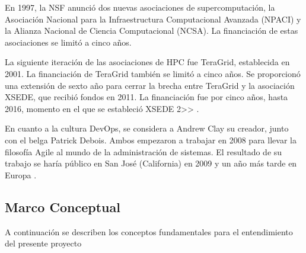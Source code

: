 \documentclass[letterpaper, 12pt, oneside]{article}
\begin{document}
    En 1997, la NSF anunció dos nuevas asociaciones de supercomputación, la Asociación Nacional para la Infraestructura Computacional Avanzada (NPACI) y la Alianza Nacional de Ciencia Computacional (NCSA). La financiación de estas asociaciones se limitó a cinco años.
    
    La siguiente iteración de las asociaciones de HPC fue TeraGrid, establecida en 2001. La financiación de TeraGrid también se limitó a cinco años. Se proporcionó una extensión de sexto año para cerrar la brecha entre TeraGrid y la asociación XSEDE, que recibió fondos en 2011. La financiación fue por cinco años, hasta 2016, momento en el que se estableció XSEDE 2>> \cite{hpcHistory} .
    
    En cuanto a la cultura DevOps, se considera a Andrew Clay su creador, junto con el belga Patrick Debois. Ambos empezaron a trabajar en 2008 para llevar la filosofía Agile al mundo de la administración de sistemas. El resultado de su trabajo se haría público en San José (California) en 2009 y un año más tarde en Europa \cite{devopsHistory1}  .
    
    \subsection{Marco Conceptual}
    
    A continuación se describen los conceptos fundamentales para el entendimiento del presente proyecto
    
\end{document}
